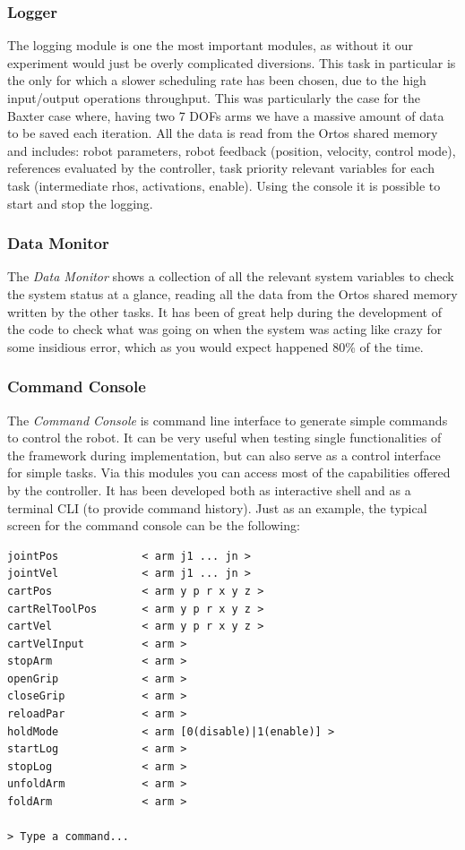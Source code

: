 \subsubsection{Logger}
The logging module is one the most important modules, as without it our experiment would just be overly complicated diversions. This task in particular is the only for which a slower scheduling rate has been chosen, due to the high input/output operations throughput. This was particularly the case for the Baxter case where, having two 7 DOFs arms we have a massive amount of data to be saved each iteration. All the data is read from the Ortos shared memory and includes: robot parameters, robot feedback (position, velocity, control mode), references evaluated by the controller, task priority relevant variables for each task (intermediate rhos, activations, enable).
Using the console it is possible to start and stop the logging.

\subsubsection{Data Monitor}
The \textit{Data Monitor} shows a collection of all the relevant system variables to check the system status at a glance, reading all the data from the Ortos shared memory written by the other tasks. It has been of great help during the development of the code to check what was going on when the system was acting like crazy for some insidious error, which as you would expect happened 80\% of the time.

\subsubsection{Command Console}
The \textit{Command Console} is command line interface to generate simple commands to control the robot. It can be very useful when testing single functionalities of the framework during implementation, but can also serve as a control interface for simple tasks. Via this modules you can access most of the capabilities offered by the controller. It has been developed both as interactive shell and as a terminal CLI (to provide command history). Just as an example, the typical screen for the command console can be the following:

\begin{lstlisting}[style=customc]
jointPos             < arm j1 ... jn >
jointVel             < arm j1 ... jn >
cartPos              < arm y p r x y z >
cartRelToolPos       < arm y p r x y z >
cartVel              < arm y p r x y z >
cartVelInput         < arm >
stopArm              < arm >
openGrip             < arm >
closeGrip            < arm >
reloadPar            < arm >
holdMode             < arm [0(disable)|1(enable)] >
startLog             < arm >
stopLog              < arm >
unfoldArm            < arm >
foldArm              < arm >

> Type a command...
\end{lstlisting}

